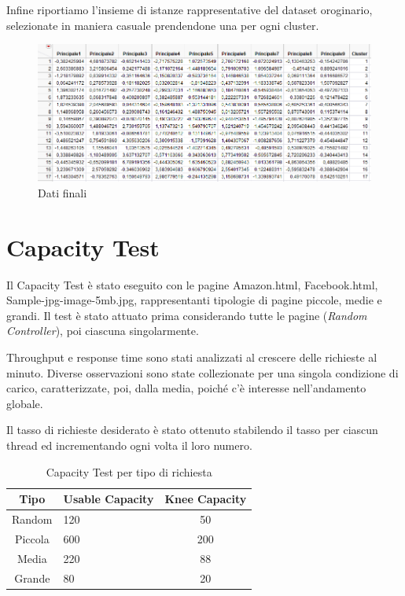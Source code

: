 		Infine riportiamo l'insieme di istanze rappresentative del dataset oroginario, selezionate in maniera casuale prendendone una per ogni cluster. 
		
		\begin{figure}[H]
			\centering
			\includegraphics[scale=0.685]{./immagine/final_data_ex3.png}
			\caption{Dati finali}
			\label{fig:final_data_ex3}
		\end{figure}
		
		
	\section{Capacity Test}
		Il Capacity Test è stato eseguito con le pagine Amazon.html, Facebook.html, Sample-jpg-image-5mb.jpg, rappresentanti tipologie di pagine piccole, medie e grandi. Il test è stato attuato prima considerando tutte le pagine (\emph{Random Controller}), poi ciascuna singolarmente.\par
		Throughput e response time sono stati analizzati al crescere delle richieste al minuto. Diverse osservazioni sono state collezionate per una singola condizione di carico, caratterizzate, poi, dalla media, poiché c'è interesse nell'andamento globale.\par
		Il tasso di richieste desiderato è stato ottenuto stabilendo il tasso per ciascun thread ed incrementando ogni volta il loro numero.
		
		\begin{table}[H]
			\footnotesize
			\caption{Capacity Test per tipo di richiesta}
			\label{tab:ct-tip}
			\centering
			\begin{tabular}{cp{}c}
				\toprule
				\textbf{Tipo} &
				\textbf{Usable Capacity} &
				\textbf{Knee Capacity}\\
				\midrule
				Random &
				120 &
				50\\
				\midrule
				Piccola &
				600 &
				200\\
				\midrule
				Media &
				220 &
				88\\
				\midrule
				Grande &
				80 &
				20\\
				\bottomrule			
			\end{tabular}
		\end{table}
	
